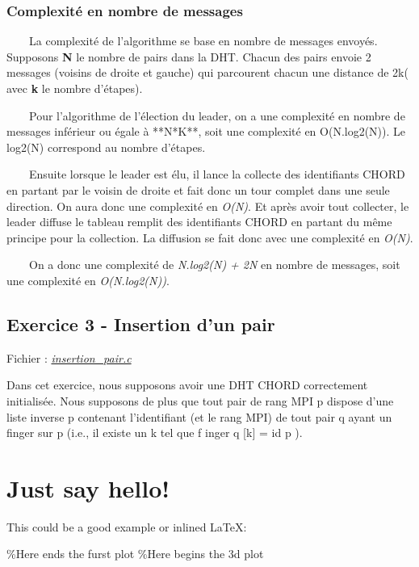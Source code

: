 \documentclass[
]{article}
\begin{document}
\hypertarget{complexituxe9-en-nombre-de-messages}{%
\subsubsection{Complexité en nombre de
messages}\label{complexituxe9-en-nombre-de-messages}}

  La complexité de l'algorithme se base en nombre de messages envoyés.
Supposons \textbf{N} le nombre de pairs dans la DHT. Chacun des pairs
envoie 2 messages (voisins de droite et gauche) qui parcourent chacun
une distance de 2k( avec \textbf{k} le nombre d'étapes).

  Pour l'algorithme de l'élection du leader, on a une complexité en
nombre de messages inférieur ou égale à **N*K**, soit une complexité en
O(N.log2(N)). Le log2(N) correspond au nombre d'étapes.

  Ensuite lorsque le leader est élu, il lance la collecte des
identifiants CHORD en partant par le voisin de droite et fait donc un
tour complet dans une seule direction. On aura donc une complexité en
\emph{O(N)}. Et après avoir tout collecter, le leader diffuse le tableau
remplit des identifiants CHORD en partant du même principe pour la
collection. La diffusion se fait donc avec une complexité en
\emph{O(N)}.

  On a donc une complexité de \emph{N.log2(N) + 2N} en nombre de
messages, soit une complexité en \emph{O(N.log2(N))}.

\hypertarget{exercice-3---insertion-dun-pair}{%
\subsection{Exercice 3 - Insertion d'un
pair}\label{exercice-3---insertion-dun-pair}}

Fichier :
\href{Exercice_3/src/insertion_pair.c}{\emph{insertion\_pair.c}}

Dans cet exercice, nous supposons avoir une DHT CHORD correctement
initialisée. Nous supposons de plus que tout pair de rang MPI p dispose
d'une liste inverse p contenant l'identifiant (et le rang MPI) de tout
pair q ayant un finger sur p (i.e., il existe un k tel que f inger q
{[}k{]} = id p ).

\hypertarget{just-say-hello}{%
\section{Just say hello!}\label{just-say-hello}}

This could be a good example or inlined \LaTeX:


\%Here ends the furst plot \hskip 5pt \%Here begins the 3d plot

\end{document}
